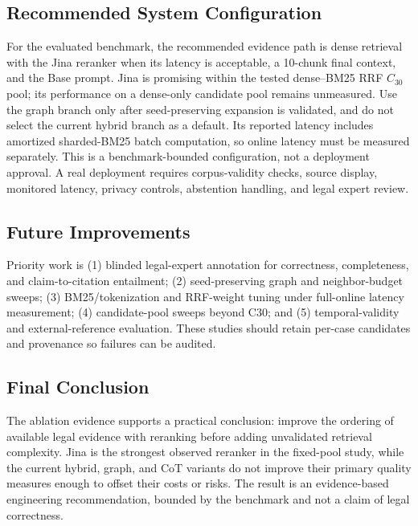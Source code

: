 \subsection{Recommended System Configuration}
\label{sec:recommended-configuration}

For the evaluated benchmark, the recommended evidence path is dense retrieval
with the Jina reranker when its latency is acceptable, a 10-chunk final
context, and the Base prompt. Jina is promising within the tested dense--BM25
RRF $C_{30}$ pool; its performance on a dense-only candidate pool remains
unmeasured. Use the graph branch only after seed-preserving expansion is
validated, and do not select the current hybrid branch as a default. Its
reported latency includes amortized sharded-BM25 batch computation, so online
latency must be measured separately. This is a benchmark-bounded configuration,
not a deployment approval. A real deployment requires corpus-validity checks,
source display, monitored latency, privacy controls, abstention handling, and
legal expert review.

\subsection{Future Improvements}
\label{sec:future-improvements}

Priority work is (1) blinded legal-expert annotation for correctness,
completeness, and claim-to-citation entailment; (2) seed-preserving graph and
neighbor-budget sweeps; (3) BM25/tokenization and RRF-weight tuning under
full-online latency measurement; (4) candidate-pool sweeps beyond C30; and
(5) temporal-validity and external-reference evaluation. These studies should
retain per-case candidates and provenance so failures can be audited.

\subsection{Final Conclusion}
\label{sec:final-conclusion}

The ablation evidence supports a practical conclusion: improve the ordering of
available legal evidence with reranking before adding unvalidated retrieval
complexity. Jina is the strongest observed reranker in the fixed-pool study,
while the current hybrid, graph, and CoT variants do not improve their primary
quality measures enough to offset their costs or risks. The result is an
evidence-based engineering recommendation, bounded by the benchmark and not a
claim of legal correctness.
